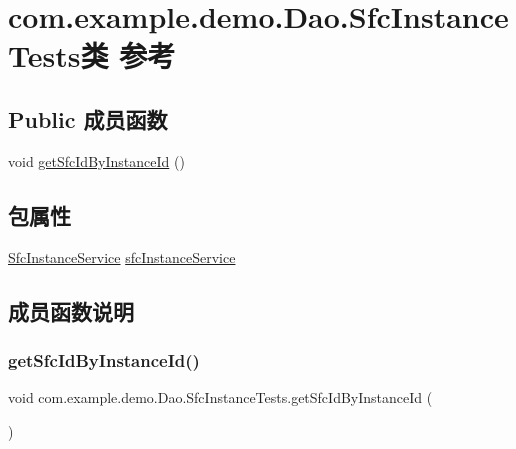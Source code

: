\hypertarget{classcom_1_1example_1_1demo_1_1_dao_1_1_sfc_instance_tests}{}\section{com.\+example.\+demo.\+Dao.\+Sfc\+Instance\+Tests类 参考}
\label{classcom_1_1example_1_1demo_1_1_dao_1_1_sfc_instance_tests}
\subsection*{Public 成员函数}
\begin{DoxyCompactItemize}
\item 
void \mbox{\hyperlink{classcom_1_1example_1_1demo_1_1_dao_1_1_sfc_instance_tests_a3b5a8a3f82a3aa9fe8ca0c1968d1dda1}{get\+Sfc\+Id\+By\+Instance\+Id}} ()
\end{DoxyCompactItemize}
\subsection*{包属性}
\begin{DoxyCompactItemize}
\item 
\mbox{\hyperlink{classcom_1_1example_1_1demo_1_1service_1_1_sfc_instance_service}{Sfc\+Instance\+Service}} \mbox{\hyperlink{classcom_1_1example_1_1demo_1_1_dao_1_1_sfc_instance_tests_ad412ed1fc35bbf90dcc26c9fb5cd1e73}{sfc\+Instance\+Service}}
\end{DoxyCompactItemize}


\subsection{成员函数说明}
\mbox{\label{classcom_1_1example_1_1demo_1_1_dao_1_1_sfc_instance_tests_a3b5a8a3f82a3aa9fe8ca0c1968d1dda1}} 
\subsubsection{\texorpdfstring{get\+Sfc\+Id\+By\+Instance\+Id()}{getSfcIdByInstanceId()}}
{\footnotesize\ttfamily void com.\+example.\+demo.\+Dao.\+Sfc\+Instance\+Tests.\+get\+Sfc\+Id\+By\+Instance\+Id (\begin{DoxyParamCaption}{ }\end{DoxyParamCaption})}



